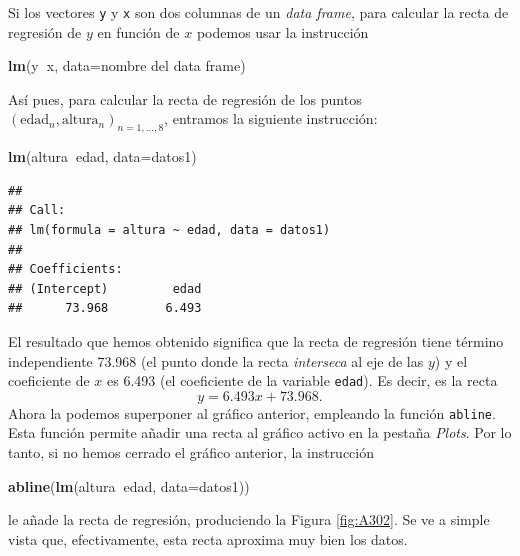 \documentclass[]{book}
\newenvironment{Shaded}{\begin{snugshade}}{\end{snugshade}}
\newcommand{\DataTypeTok}[1]{\textcolor[rgb]{0.13,0.29,0.53}{#1}}
\newcommand{\KeywordTok}[1]{\textcolor[rgb]{0.13,0.29,0.53}{\textbf{#1}}}
\newcommand{\NormalTok}[1]{#1}
\newcommand{\OperatorTok}[1]{\textcolor[rgb]{0.81,0.36,0.00}{\textbf{#1}}}
\theoremstyle{definition}
\theoremstyle{definition}
\theoremstyle{definition}
\theoremstyle{remark}
\begin{document}
Si los vectores \texttt{y} y \texttt{x} son dos columnas de un \emph{data frame}, para calcular la recta de regresión de \(y\) en función de \(x\) podemos usar la instrucción

\begin{Shaded}
\begin{Highlighting}[]
\KeywordTok{lm}\NormalTok{(y}\OperatorTok{~}\NormalTok{x, }\DataTypeTok{data=}\NormalTok{nombre del data frame)}
\end{Highlighting}
\end{Shaded}

Así pues, para calcular la recta de regresión de los puntos \((\mathrm{edad}_n,\textrm{altura}_n)_{n=1,\ldots,8}\), entramos la siguiente instrucción:

\begin{Shaded}
\begin{Highlighting}[]
\KeywordTok{lm}\NormalTok{(altura}\OperatorTok{~}\NormalTok{edad, }\DataTypeTok{data=}\NormalTok{datos1)}
\end{Highlighting}
\end{Shaded}

\begin{verbatim}
## 
## Call:
## lm(formula = altura ~ edad, data = datos1)
## 
## Coefficients:
## (Intercept)         edad  
##      73.968        6.493
\end{verbatim}

El resultado que hemos obtenido significa que la recta de regresión tiene término independiente 73.968 (el punto donde la recta \emph{interseca} al eje de las \(y\)) y el coeficiente de \(x\) es 6.493 (el coeficiente de la variable \texttt{edad}). Es decir, es la recta
\[
y=6.493x+73.968.
\]
Ahora la podemos superponer al gráfico anterior, empleando la función \texttt{abline}. Esta función permite añadir una recta al gráfico activo en la pestaña \emph{Plots}. Por lo tanto, si no hemos cerrado el gráfico anterior, la instrucción

\begin{Shaded}
\begin{Highlighting}[]
\KeywordTok{abline}\NormalTok{(}\KeywordTok{lm}\NormalTok{(altura}\OperatorTok{~}\NormalTok{edad, }\DataTypeTok{data=}\NormalTok{datos1))}
\end{Highlighting}
\end{Shaded}

le añade la recta de regresión, produciendo la Figura \ref{fig:A302}.
Se ve a simple vista que, efectivamente, esta recta aproxima muy bien los datos.
\end{document}
